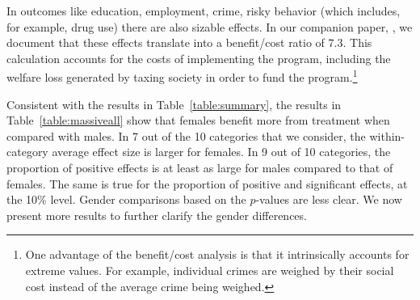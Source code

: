 In outcomes like education, employment, crime, risky behavior (which includes, for example, drug use) there are also sizable effects. In our companion paper, \citet{Garcia_Heckman_Leaf_etal_2017_Comp_CBA_Unpublished}, we document that these effects translate into a benefit/cost ratio of $7.3$. This calculation accounts for the costs of implementing the program, including the welfare loss generated by taxing society in order to fund the program.\footnote{One advantage of the benefit/cost analysis is that it intrinsically accounts for extreme values. For example, individual crimes are weighed by their social cost instead of the average crime being weighed.}

Consistent with the results in Table~\ref{table:summary}, the results in Table~\ref{table:massiveall} show that females benefit more from treatment when compared with males. In 7 out of the 10 categories that we consider, the within-category average effect size is larger for females. In 9 out of 10 categories, the proportion of positive effects is at least as large for males compared to that of females. The same is true for the proportion of positive and significant effects, at the 10\% level. Gender comparisons based on the \citet{Rosenbaum_2005_Distribution_JRSS} $p$-values are less clear. We now present more results to further clarify the gender differences.


